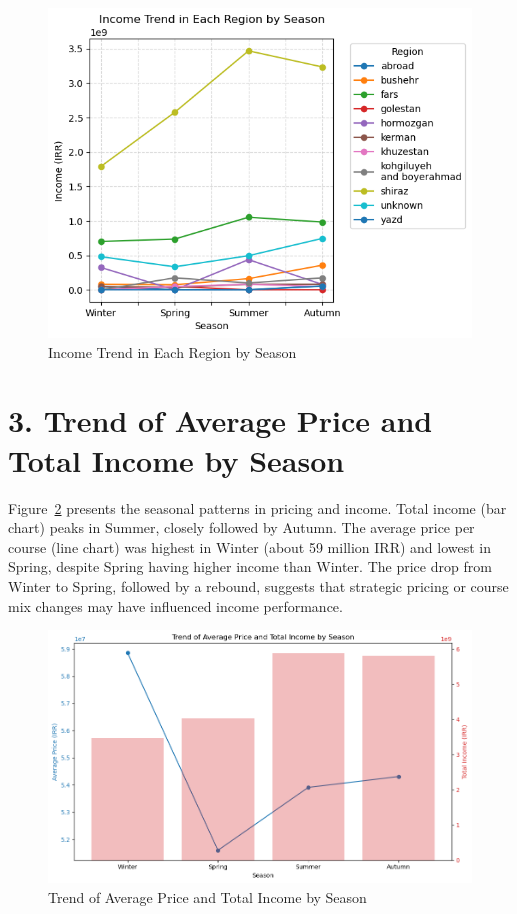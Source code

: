 \documentclass[12pt,a4paper]{article}
\begin{document}
\begin{figure}[h!]
    \centering
    \includegraphics[width=1\textwidth]{Income Trend in Each Region by Season.png}
    \caption{Income Trend in Each Region by Season}
    \label{fig:income-region-season}
\end{figure}

\section*{3. Trend of Average Price and Total Income by Season}
Figure~\ref{fig:price-income-season} presents the seasonal patterns in pricing and income. Total income (bar chart) peaks in Summer, closely followed by Autumn. The average price per course (line chart) was highest in Winter (about 59 million IRR) and lowest in Spring, despite Spring having higher income than Winter. The price drop from Winter to Spring, followed by a rebound, suggests that strategic pricing or course mix changes may have influenced income performance.

\begin{figure}[h!]
    \centering
    \includegraphics[width=1\textwidth]{Trend of Average Price and Total Income by Season.png}
    \caption{Trend of Average Price and Total Income by Season}
    \label{fig:price-income-season}
\end{figure}
\end{document}
